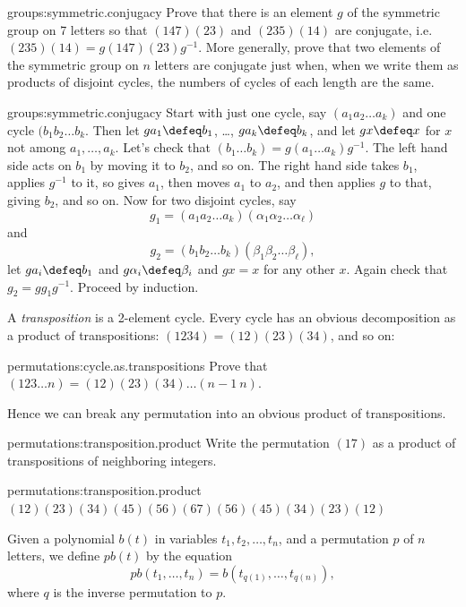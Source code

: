 \begin{problem}{groups:symmetric.conjugacy}
Prove that there is an element \(g\) of the symmetric group on 7 letters so that \((147)(23)\) and \((235)(14)\) are conjugate, i.e. \((235)(14)=g(147)(23)g^{-1}\).
More generally, prove that two elements of the symmetric group on \(n\) letters are conjugate just when, when we write them as products of disjoint cycles, the numbers of cycles of each length are the same. 
\end{problem}
\begin{answer}{groups:symmetric.conjugacy}
Start with just one cycle, say \((a_1a_2\dots a_k)\) and one cycle \((b_1b_2\dots b_k\).
Then let \(ga_1\defeq b_1\), \dots, \(ga_k\defeq b_k\), and let \(gx\defeq x\) for \(x\) not among \(a_1,\dots,a_k\).
Let's check that \((b_1\dots b_k)=g(a_1 \dots a_k)g^{-1}\).
The left hand side acts on \(b_1\) by moving it to \(b_2\), and so on.
The right hand side takes \(b_1\), applies \(g^{-1}\) to it, so gives \(a_1\), then moves \(a_1\) to \(a_2\), and then applies \(g\) to that, giving \(b_2\), and so on.
Now for two disjoint cycles, say 
\[
g_1 = (a_1 a_2 \dots a_k)(\alpha_1 \alpha_2 \dots \alpha_{\ell})
\]
and
\[
g_2 = (b_1 b_2 \dots b_k)(\beta_1 \beta_2 \dots \beta_{\ell}),
\]
let \(ga_i \defeq b_1\) and \(g\alpha_i\defeq \beta_i\) and \(gx=x\) for any other \(x\).
Again check that \(g_2=gg_1g^{-1}\).
Proceed by induction.
\end{answer}
A \emph{transposition} is a 2-element cycle.
Every cycle has an obvious decomposition as a product of transpositions: \((1234)=(12)(23)(34)\), and so on: 
\begin{problem}{permutations:cycle.as.transpositions}
Prove that \((123\dots n)=(12)(23)(34)\dots(n-1 \ n)\).
\end{problem}
Hence we can break any permutation into an obvious product of transpositions.
\begin{problem}{permutations:transposition.product}
Write the permutation \((17)\) as a product of transpositions of neighboring integers.
\end{problem}
\begin{answer}{permutations:transposition.product}
\((12)(23)(34)(45)(56)(67)(56)(45)(34)(23)(12)\)
\end{answer}
Given a polynomial \(b(t)\) in variables \(t_1,t_2,\dots,t_n\), and a permutation \(p\) of \(n\) letters, we define \(pb(t)\) by the equation
\[
pb(t_1,\dots,t_n)=b(t_{q(1)},\dots,t_{q(n)}),
\]
where \(q\) is the inverse permutation to \(p\).

